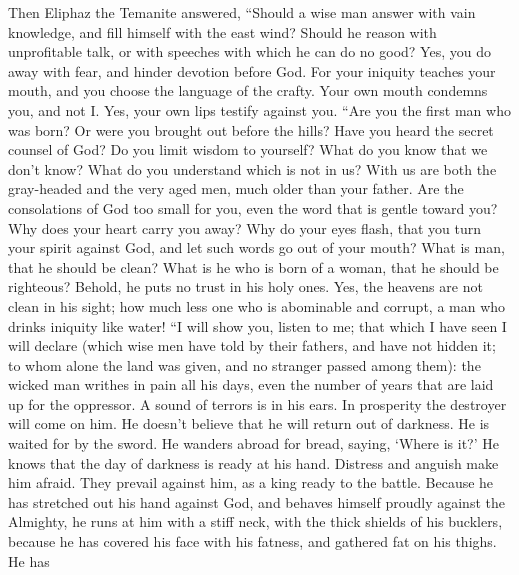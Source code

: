  Then Eliphaz the Temanite answered, 
``Should a wise man answer with vain knowledge, and fill himself with
the east wind?  Should he reason with unprofitable talk,
or with speeches with which he can do no good?  Yes, you
do away with fear, and hinder devotion before God.  For
your iniquity teaches your mouth, and you choose the language of the
crafty.  Your own mouth condemns you, and not I. Yes, your
own lips testify against you.  ``Are you the first man who
was born? Or were you brought out before the hills?  Have
you heard the secret counsel of God? Do you limit wisdom to yourself?
 What do you know that we don't know? What do you
understand which is not in us?  With us are both the
gray-headed and the very aged men, much older than your father.
 Are the consolations of God too small for you, even the
word that is gentle toward you?  Why does your heart
carry you away? Why do your eyes flash,  that you turn
your spirit against God, and let such words go out of your mouth?
 What is man, that he should be clean? What is he who is
born of a woman, that he should be righteous?  Behold, he
puts no trust in his holy ones. Yes, the heavens are not clean in his
sight;  how much less one who is abominable and corrupt,
a man who drinks iniquity like water!  ``I will show you,
listen to me; that which I have seen I will declare 
(which wise men have told by their fathers, and have not hidden it;
 to whom alone the land was given, and no stranger passed
among them):  the wicked man writhes in pain all his
days, even the number of years that are laid up for the oppressor.
 A sound of terrors is in his ears. In prosperity the
destroyer will come on him.  He doesn't believe that he
will return out of darkness. He is waited for by the sword.
 He wanders abroad for bread, saying, `Where is it?' He
knows that the day of darkness is ready at his hand. 
Distress and anguish make him afraid. They prevail against him, as a
king ready to the battle.  Because he has stretched out
his hand against God, and behaves himself proudly against the Almighty,
 he runs at him with a stiff neck, with the thick shields
of his bucklers,  because he has covered his face with
his fatness, and gathered fat on his thighs.  He has
